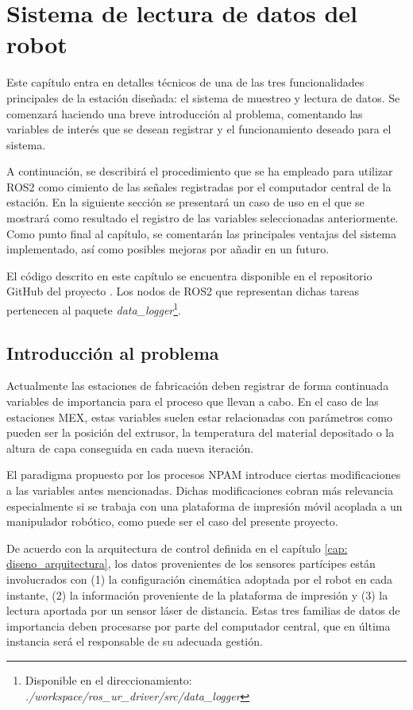 \chapter{Sistema de lectura de datos del robot}
\label{cap:lectura_datos}

Este capítulo entra en detalles técnicos de una de las tres funcionalidades principales de la estación diseñada: el sistema de muestreo y lectura de datos. Se comenzará haciendo una breve introducción al problema, comentando las variables de interés que se desean registrar y el funcionamiento deseado para el sistema. 

A continuación, se describirá el procedimiento que se ha empleado para utilizar ROS2 como cimiento de las señales registradas por el computador central de la estación. En la siguiente sección se presentará un caso de uso en el que se mostrará como resultado el registro de las variables seleccionadas anteriormente. Como punto final al capítulo, se comentarán las principales ventajas del sistema implementado, así como posibles mejoras por añadir en un futuro.

El código descrito en este capítulo se encuentra disponible en el repositorio GitHub del proyecto \cite{repo_github_TFM_MiguelLerinAlonso}. Los nodos de ROS2 que representan dichas tareas pertenecen al paquete \textit{data\_logger}\footnote{Disponible en el direccionamiento: \textit{./workspace/ros\_ur\_driver/src/data\_logger}}.

\section{Introducción al problema}
Actualmente las estaciones de fabricación deben registrar de forma continuada variables de importancia para el proceso que llevan a cabo. En el caso de las estaciones \acrshort{MEX}, estas variables suelen estar relacionadas con parámetros como pueden ser la posición del extrusor, la temperatura del material depositado o la altura de capa conseguida en cada nueva iteración.

El paradigma propuesto por los procesos \acrshort{NPAM} introduce ciertas modificaciones a las variables antes mencionadas. Dichas modificaciones cobran más relevancia especialmente si se trabaja con una plataforma de impresión móvil acoplada a un manipulador robótico, como puede ser el caso del presente proyecto.

De acuerdo con la arquitectura de control definida en el capítulo \ref{cap: diseno_arquitectura}, los datos provenientes de los sensores partícipes están involucrados con (1) la configuración cinemática adoptada por el robot en cada instante, (2) la información proveniente de la plataforma de impresión y (3) la lectura aportada por un sensor láser de distancia. Estas tres familias de datos de importancia deben procesarse por parte del computador central, que en última instancia será el responsable de su adecuada gestión.

